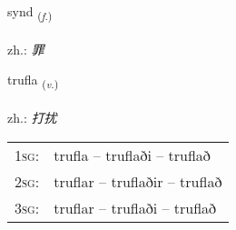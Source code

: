 \documentclass[frontgrid, backgrid]{flacards}\usepackage[]{graphicx}\usepackage[]{xcolor}
\begin{document}
\renewcommand{\flhead}{\vskip5pt \fboxsep=0pt {\small\bfseries\footnotesize Nafnorð | 名词}}
\renewcommand{\fcfoot}{\vskip5pt \fboxsep=0pt \hspace{2pt}{\small\bfseries\footnotesize 3K}}

\renewcommand{\blhead}{\vskip5pt {\small\bfseries\footnotesize Nafnorð | 名词 }}
\renewcommand{\bcfoot}{\vskip5pt \hspace{2pt}{\small\bfseries\footnotesize 3K}}


{synd \small{\textsubscript{(\textit{f.})}} \\[1ex] %
\textphonetic{[sɪnt]} \\
zh.: \emph{罪} \\  [2ex]
\renewcommand*{\arraystretch}{0.8}
}

\renewcommand{\flhead}{\vskip5pt \fboxsep=0pt {\small\bfseries\footnotesize Sagnorð | 动词}}
\renewcommand{\fcfoot}{\vskip5pt \fboxsep=0pt \hspace{2pt}{\small\bfseries\footnotesize 3K}}

\renewcommand{\blhead}{\vskip5pt {\small\bfseries\footnotesize Sagnorð | 动词 }}
\renewcommand{\bcfoot}{\vskip5pt \hspace{2pt}{\small\bfseries\footnotesize 3K}}


{trufla \small{\textsubscript{(\textit{v.})}} \\[1ex] %
\textphonetic{[tʰrʏpla]} \\
zh.: \emph{打扰} \\  [2ex]
\renewcommand*{\arraystretch}{0.8}
\begin{tabular}{p{1cm}l}
\textsc{1sg}: & trufla -- truflaði -- truflað \\ 
\textsc{2sg}: & truflar -- truflaðir -- truflað \\ 
\textsc{3sg}: & truflar -- truflaði -- truflað \\ 
\end{tabular}
}
\end{document}

